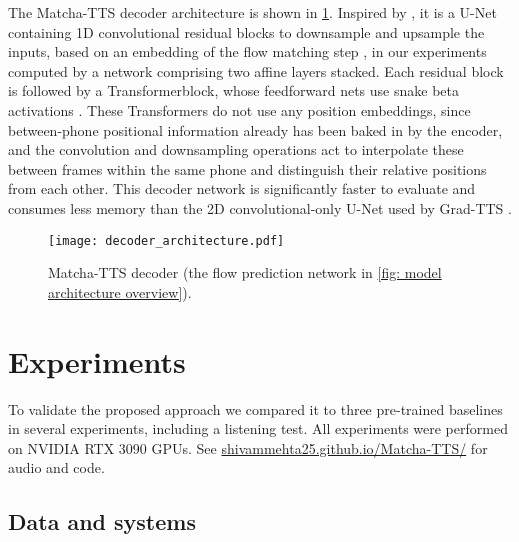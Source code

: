 \documentclass[british]{article}
\newcommand{\webpageurl}{https://shivammehta25.github.io/Matcha-TTS/}
\newcommand{\webpageurltext}{shivammehta25.github.io/Matcha-TTS/}
\begin{document}
The Matcha-TTS decoder architecture is shown in \cref{fig: decoder architecture}.
Inspired by \cite{rombach2022high}, it is a U-Net containing 1D convolutional residual blocks to downsample and upsample the inputs, based on an embedding of the flow matching step , in our experiments computed by a network comprising two affine layers stacked.
Each residual block is followed by a Transformerblock, whose feedforward nets use snake beta activations \cite{lee2023bigvgan}.
These Transformers do not use any position embeddings, since between-phone positional information already has been baked in by the encoder, and the convolution and downsampling operations act to interpolate these between frames within the same phone and distinguish their relative positions from each other.
This decoder network is significantly faster to evaluate and consumes less memory than the 2D convolutional-only U-Net used by Grad-TTS \cite{popov2021grad}.
\begin{figure}[!t]
\centering
\texttt{[image: decoder\_architecture.pdf]}
\caption{Matcha-TTS decoder (the flow prediction network in \cref{fig: model architecture overview}).}
\label{fig: decoder architecture}
\vspace{-\baselineskip}
\end{figure}













\section{Experiments}
\label{sec:experiments}
To validate the proposed approach we compared it to three pre-trained baselines in several experiments, including a listening test.
All experiments were performed on NVIDIA RTX 3090 GPUs.
See \href{\webpageurl}{\webpageurltext} for audio and code.

\subsection{Data and systems}
\label{ssec:systems}
\end{document}
